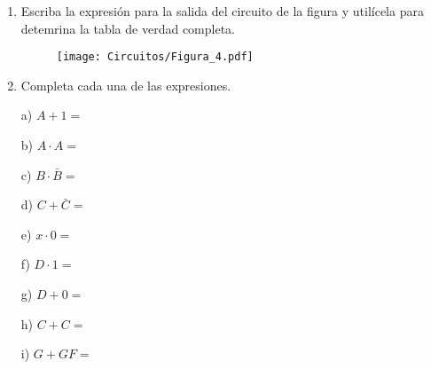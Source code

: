 \documentclass[a4paper, 12pt]{article}
\newcommand{\Aspace}{0.2cm}
\begin{document}
\begin{enumerate}
        \item Escriba la expresión para la salida del circuito de la figura y utilícela para detemrina la tabla de verdad completa.
        \begin{figure}[!ht]
            \centering
            \texttt{[image: Circuitos/Figura\_4.pdf]}
        \end{figure}
            \vspace{\Aspace} \par
            { \color{azul}  }
        


        \item Completa cada una de las expresiones.
            \vspace{\Aspace} \par
            a) $A + 1 = $
            { \color{azul}  }

            \vspace{\Aspace} \par
            b) $A \cdot A = $
            { \color{azul}  }

            \vspace{\Aspace} \par
            c) $B \cdot \bar{B} = $
            { \color{azul}  }

            \vspace{\Aspace} \par
            d) $C + \bar{C} = $
            { \color{azul}  }

            \vspace{\Aspace} \par
            e) $x \cdot 0 = $
            { \color{azul}  }

            \vspace{\Aspace} \par
            f) $D \cdot 1 = $
            { \color{azul}  }

            \vspace{\Aspace} \par
            g) $D + 0 = $
            { \color{azul}  }

            \vspace{\Aspace} \par
            h) $C + C = $
            { \color{azul}  }

            \vspace{\Aspace} \par
            i) $G + GF = $
            { \color{azul}  }


\end{enumerate}
\end{document}
